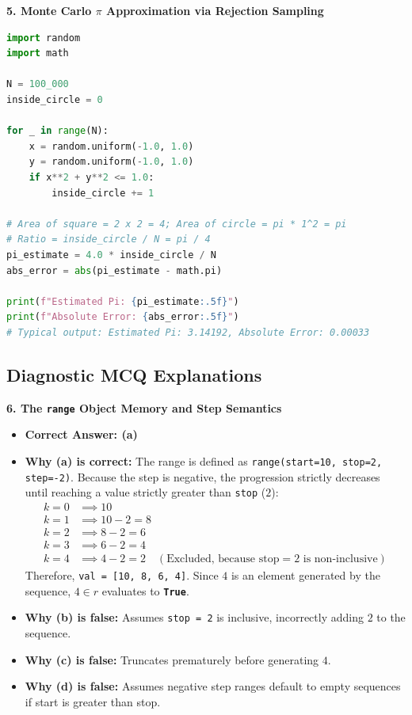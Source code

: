 \textbf{5. Monte Carlo $\pi$ Approximation via Rejection Sampling}
\begin{lstlisting}[language=Python]
import random
import math

N = 100_000
inside_circle = 0

for _ in range(N):
    x = random.uniform(-1.0, 1.0)
    y = random.uniform(-1.0, 1.0)
    if x**2 + y**2 <= 1.0:
        inside_circle += 1

# Area of square = 2 x 2 = 4; Area of circle = pi * 1^2 = pi
# Ratio = inside_circle / N = pi / 4
pi_estimate = 4.0 * inside_circle / N
abs_error = abs(pi_estimate - math.pi)

print(f"Estimated Pi: {pi_estimate:.5f}")
print(f"Absolute Error: {abs_error:.5f}")
# Typical output: Estimated Pi: 3.14192, Absolute Error: 0.00033
\end{lstlisting}

\subsection*{Diagnostic MCQ Explanations}

\textbf{6. The \texttt{range} Object Memory and Step Semantics}
\begin{itemize}
    \item \textbf{Correct Answer: (a)}
    \item \textbf{Why (a) is correct:}
    The range is defined as \texttt{range(start=10, stop=2, step=-2)}.
    Because the step is negative, the progression strictly decreases until reaching a value strictly greater than \texttt{stop} ($2$):
    \begin{align*}
    k = 0 &\implies 10 \\
    k = 1 &\implies 10 - 2 = 8 \\
    k = 2 &\implies 8 - 2 = 6 \\
    k = 3 &\implies 6 - 2 = 4 \\
    k = 4 &\implies 4 - 2 = 2 \quad (\text{Excluded, because } \text{stop} = 2 \text{ is non-inclusive})
    \end{align*}
    Therefore, \texttt{val = [10, 8, 6, 4]}.
    Since $4$ is an element generated by the sequence, $4 \in r$ evaluates to \textbf{\texttt{True}}.
    \item \textbf{Why (b) is false:} Assumes \texttt{stop = 2} is inclusive, incorrectly adding $2$ to the sequence.
    \item \textbf{Why (c) is false:} Truncates prematurely before generating $4$.
    \item \textbf{Why (d) is false:} Assumes negative step ranges default to empty sequences if start is greater than stop.
\end{itemize}

